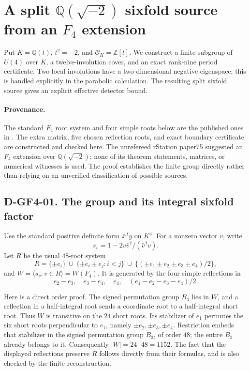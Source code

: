 \section{A split \(\mathbb Q(\sqrt{-2})\) sixfold source from an \(F_4\) extension}
\label{sec:gf4-new}

Put \(K=\mathbb Q(t)\), \(t^2=-2\), and \(\mathcal O_K=\mathbb Z[t]\).
We construct a finite subgroup of \(U(4)\) over \(K\), a twelve-involution
cover, and an exact rank-nine period certificate.  Two local involutions
have a two-dimensional negative eigenspace; this is handled explicitly
in the parabolic calculation.  The resulting split sixfold source gives
an explicit effective detector bound.

\paragraph{Provenance.}
The standard \(F_4\) root system and four simple roots below are the
published ones in \cite[\S3, p.~83]{GF4:Cahn}.  The extra matrix, five
chosen reflection roots, and exact boundary certificate are constructed
and checked here.  The unrefereed rStation paper75 suggested an \(F_4\)
extension over \(\mathbb Q(\sqrt{-2})\); none of its theorem statements,
matrices, or numerical witnesses is used.  The proof establishes the
finite group directly rather than relying on an unverified classification
of possible sources.

\subsection*{D-GF4-01. The group and its integral sixfold factor}

Use the standard positive definite form \(\bar x^{\,t}y\) on \(K^4\).
For a nonzero vector \(v\), write
\[
                  s_v=1-2v\bar v^{\,t}/(\bar v^{\,t}v).
\]
Let \(R\) be the usual \(48\)-root system
\[
 R=\{\pm e_i\}\ \cup\ \{\pm e_i\pm e_j:i<j\}
       \ \cup\ \{(\pm e_1\pm e_2\pm e_3\pm e_4)/2\},
\]
and \(W=\langle s_v:v\in R\rangle=W(F_4)\).  It is generated by the
four simple reflections in
\[
 e_2-e_3,\quad e_3-e_4,\quad e_4,\quad(e_1-e_2-e_3-e_4)/2.
\]

Here is a direct order proof.  The signed permutation group \(B_4\)
lies in \(W\), and a reflection in a half-integral root sends a coordinate
root to a half-integral short root.  Thus \(W\) is transitive on the
\(24\) short roots.  Its stabilizer of \(e_1\) permutes the six short
roots perpendicular to \(e_1\), namely \(\pm e_2,\pm e_3,\pm e_4\).
Restriction embeds that stabilizer in the signed permutation group
\(B_3\), of order \(48\); the entire \(B_3\) already belongs to it.
Consequently \(|W|=24\cdot48=1152\).  The fact that the displayed
reflections preserve \(R\) follows directly from their formulas, and is
also checked by the finite reconstruction.

